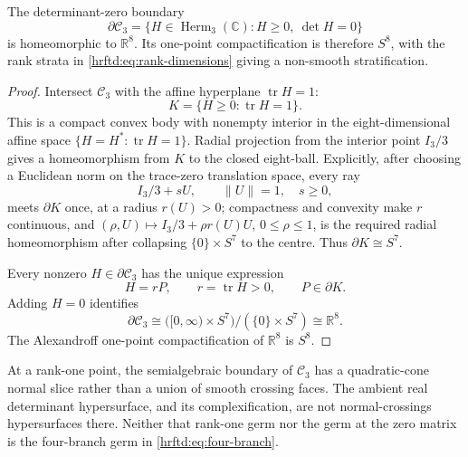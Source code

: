 \begin{proposition}
\label{hrftd:prop:hermitian-compactification}
The determinant-zero boundary
\[
 \partial\mathcal C_3
 =\{H\in\operatorname{Herm}_3(\mathbb C):H\ge0,\ \det H=0\}
\]
is homeomorphic to \(\mathbb R^8\).  Its one-point compactification is
therefore \(S^8\), with the rank strata in
\eqref{hrftd:eq:rank-dimensions} giving a non-smooth stratification.
\end{proposition}

\begin{proof}
Intersect \(\mathcal C_3\) with the affine hyperplane \(\operatorname{tr}H=1\):
\[
 K=\{H\ge0:\operatorname{tr}H=1\}.
\]
This is a compact convex body with nonempty interior in the
eight-dimensional affine space
\(\{H=H^*:\operatorname{tr}H=1\}\).  Radial projection from the interior
point \(I_3/3\) gives a homeomorphism from \(K\) to the closed
eight-ball.  Explicitly, after choosing a Euclidean norm on the trace-zero
translation space, every ray
\[
 I_3/3+sU,\qquad \|U\|=1,\quad s\ge0,
\]
meets \(\partial K\) once, at a radius \(r(U)>0\); compactness and convexity
make \(r\) continuous, and
\((\rho,U)\mapsto I_3/3+\rho r(U)U\), \(0\le\rho\le1\), is the required
radial homeomorphism after collapsing \(\{0\}\times S^7\) to the centre.
Thus \(\partial K\cong S^7\).

Every nonzero \(H\in\partial\mathcal C_3\) has the unique expression
\[
 H=rP,\qquad r=\operatorname{tr}H>0,\qquad P\in\partial K.
\]
Adding \(H=0\) identifies
\[
 \partial\mathcal C_3
 \cong
 \bigl([0,\infty)\times S^7\bigr)/(\{0\}\times S^7)
 \cong\mathbb R^8.
\]
The Alexandroff one-point compactification of \(\mathbb R^8\) is \(S^8\).
\end{proof}

\begin{theorem}
\label{hrftd:thm:hermitian-not-snc}
At a rank-one point, the semialgebraic boundary of \(\mathcal C_3\) has a
quadratic-cone normal slice rather than a union of smooth crossing faces.
The ambient real determinant hypersurface, and its complexification, are not
normal-crossings hypersurfaces there.  Neither that rank-one germ nor the
germ at the zero matrix is the four-branch germ in
\eqref{hrftd:eq:four-branch}.
\end{theorem}

